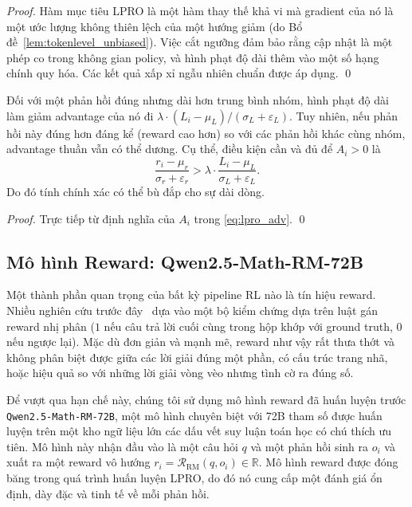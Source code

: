 \documentclass[11pt,a4paper]{article}
\begin{document}
\begin{proof}
Hàm mục tiêu LPRO là một hàm thay thế khả vi mà gradient của nó là một ước lượng không thiên lệch của một hướng giảm (do Bổ đề~\ref{lem:tokenlevel_unbiased}). Việc cắt ngưỡng đảm bảo rằng cập nhật là một phép co trong không gian policy, và hình phạt độ dài thêm vào một số hạng chính quy hóa. Các kết quả xấp xỉ ngẫu nhiên chuẩn được áp dụng. \qed
\end{proof}

\begin{lemma}\label{lem:no_bias}
Đối với một phản hồi đúng nhưng dài hơn trung bình nhóm, hình phạt độ dài làm giảm advantage của nó đi \(\lambda \cdot (L_i-\mu_L)/(\sigma_L+\varepsilon_L)\). Tuy nhiên, nếu phản hồi này đúng hơn đáng kể (reward cao hơn) so với các phản hồi khác cùng nhóm, advantage thuần vẫn có thể dương. Cụ thể, điều kiện cần và đủ để \(A_i > 0\) là
\[
\frac{r_i - \mu_r}{\sigma_r+\varepsilon_r} > \lambda \cdot \frac{L_i-\mu_L}{\sigma_L+\varepsilon_L}.
\]
Do đó tính chính xác có thể bù đắp cho sự dài dòng.
\end{lemma}

\begin{proof}
Trực tiếp từ định nghĩa của \(A_i\) trong \eqref{eq:lpro_adv}. \qed
\end{proof}



\subsection{Mô hình Reward: Qwen2.5-Math-RM-72B}

Một thành phần quan trọng của bất kỳ pipeline RL nào là tín hiệu reward. Nhiều nghiên cứu trước đây~\citep{shao2024deepseekmath, yang2024qwen25math} dựa vào một bộ kiểm chứng dựa trên luật gán reward nhị phân ($1$ nếu câu trả lời cuối cùng trong hộp khớp với ground truth, $0$ nếu ngược lại). Mặc dù đơn giản và mạnh mẽ, reward như vậy rất thưa thớt và không phân biệt được giữa các lời giải đúng một phần, có cấu trúc trang nhã, hoặc hiệu quả so với những lời giải vòng vèo nhưng tình cờ ra đúng số.

Để vượt qua hạn chế này, chúng tôi sử dụng mô hình reward đã huấn luyện trước \texttt{Qwen2.5-Math-RM-72B}, một mô hình chuyên biệt với 72B tham số được huấn luyện trên một kho ngữ liệu lớn các dấu vết suy luận toán học có chú thích ưu tiên. Mô hình này nhận đầu vào là một câu hỏi $q$ và một phản hồi sinh ra $o_i$ và xuất ra một reward vô hướng $r_i = \mathcal{R}_{\text{RM}}(q, o_i) \in \mathbb{R}$. Mô hình reward được đóng băng trong quá trình huấn luyện LPRO, do đó nó cung cấp một đánh giá ổn định, dày đặc và tinh tế về mỗi phản hồi.
\end{document}
